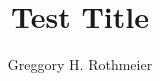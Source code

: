 \documentclass{report}
\begin{document}
\title{Test Title}
\author{Greggory H. Rothmeier}
\maketitle{}



% 
% 
\listoftables
\listoffigures







\appendix

% 
  
\end{document}
